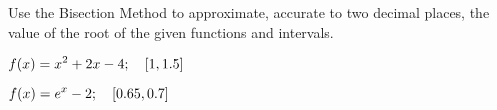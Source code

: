 \begin{activity} \label{A:1.3.3}
Use the Bisection Method to approximate, accurate to two decimal places, the value of the root of the given functions and intervals.

\ba
\item $\displaystyle f(x) = x^2 + 2x - 4; \quad [1,1.5]$
\item $\displaystyle f(x) = e^x - 2; \quad [0.65, 0.7]$
\ea
\end{activity}

\aftera
